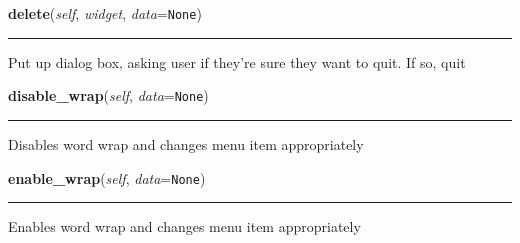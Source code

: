     \vspace{0.5ex}

\hspace{.8\funcindent}\begin{boxedminipage}{\funcwidth}

    \raggedright \textbf{delete}(\textit{self}, \textit{widget}, \textit{data}={\tt None})

    \vspace{-1.5ex}

    \rule{\textwidth}{0.5\fboxrule}
\setlength{\parskip}{2ex}
    Put up dialog box, asking user if they're sure they want to quit. If 
    so, quit

\setlength{\parskip}{1ex}
    \end{boxedminipage}

    \label{cuon:Editor:editor:editorwindow:disable_wrap}

    \vspace{0.5ex}

\hspace{.8\funcindent}\begin{boxedminipage}{\funcwidth}

    \raggedright \textbf{disable\_wrap}(\textit{self}, \textit{data}={\tt None})

    \vspace{-1.5ex}

    \rule{\textwidth}{0.5\fboxrule}
\setlength{\parskip}{2ex}
    Disables word wrap and changes menu item appropriately

\setlength{\parskip}{1ex}
    \end{boxedminipage}

    \label{cuon:Editor:editor:editorwindow:enable_wrap}

    \vspace{0.5ex}

\hspace{.8\funcindent}\begin{boxedminipage}{\funcwidth}

    \raggedright \textbf{enable\_wrap}(\textit{self}, \textit{data}={\tt None})

    \vspace{-1.5ex}

    \rule{\textwidth}{0.5\fboxrule}
\setlength{\parskip}{2ex}
    Enables word wrap and changes menu item appropriately

\setlength{\parskip}{1ex}
    \end{boxedminipage}


